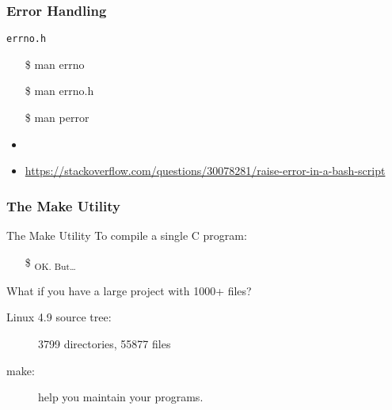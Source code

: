 \subsubsection{Error Handling}
\label{sec:error-handling}

\begin{frame}{\texttt{errno.h}}
  \begin{center}
  \end{center}\ttfamily
  \begin{itemize}
  \item[\$] man errno
  \item[\$] man errno.h
  \item[\$] man perror
  \end{itemize}
\end{frame}

\begin{itemize}
\item {}
\item \url{https://stackoverflow.com/questions/30078281/raise-error-in-a-bash-script}
\end{itemize}

\subsubsection{The Make Utility}

\begin{frame}{The Make Utility}
  To compile a single C program:
  \begin{itemize}
  \item[\$] \quad{\Huge \correct}\textsubscript{{\tiny OK. But\ldots}}
  \end{itemize}
  \begin{block}{What if you have a large project with 1000+ files?}
    \begin{center}
    \end{center}
    \begin{description}
    \item[Linux 4.9 source tree:] 3799 directories, 55877 files
    \end{description}
  \end{block}
  \begin{description}
  \item[make:] help you maintain your programs.
  \end{description}
\end{frame}

